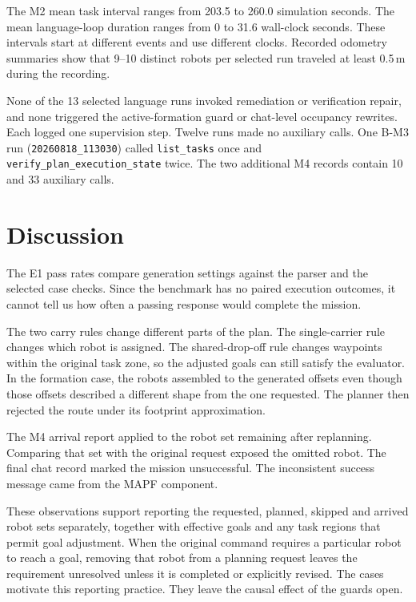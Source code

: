 \documentclass[pdflatex,sn-mathphys-num]{sn-jnl}
\newcommand{\code}[1]{{\def\{{\textnormal{\textbraceleft}}\def\}{\textnormal{\textbraceright}}\texttt{#1}}}
\begin{document}
The M2 mean task interval ranges from 203.5 to 260.0 simulation seconds.
The mean language-loop duration ranges from 0 to 31.6 wall-clock seconds.
These intervals start at different events and use different clocks.
Recorded odometry summaries show that 9--10 distinct robots per selected
run traveled at least 0.5\,m during the recording.

None of the 13 selected language runs invoked remediation or verification
repair, and none triggered the active-formation guard or chat-level
occupancy rewrites. Each logged one supervision step. Twelve runs made no
auxiliary calls. One B-M3 run (\code{20260818\_113030}) called
\code{list\_tasks} once and \code{verify\_plan\_execution\_state} twice.
The two additional M4 records contain 10 and 33 auxiliary calls.

\section{Discussion}
\label{sec:discussion}

The E1 pass rates compare generation settings against the parser and the
selected case checks. Since the benchmark has no paired execution outcomes,
it cannot tell us how often a passing response would complete the mission.

The two carry rules change different parts of the plan. The single-carrier
rule changes which robot is assigned. The shared-drop-off rule changes
waypoints within the original task zone, so the adjusted goals can still
satisfy the evaluator. In the formation case, the robots assembled to the
generated offsets even though those offsets described a different shape from
the one requested. The planner then rejected the route under its footprint
approximation.

The M4 arrival report applied to the robot set remaining after replanning.
Comparing that set with the original request exposed the omitted robot.
The final chat record marked the mission unsuccessful. The inconsistent
success message came from the MAPF component.

These observations support reporting the requested, planned, skipped and arrived
robot sets separately, together with effective goals and any task regions that
permit goal adjustment. When the original command requires a particular robot to
reach a goal, removing that robot from a planning request leaves the requirement
unresolved unless it is completed or explicitly revised. The cases motivate
this reporting practice. They leave the causal effect of the guards open.
\end{document}
